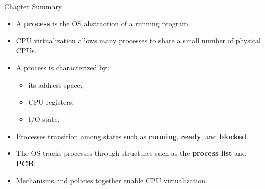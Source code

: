 \begin{frame}{Chapter Summary}

\begin{itemize}
    \item A \textbf{process} is the OS abstraction of a running program.
    \item CPU virtualization allows many processes to share a small
          number of physical CPUs.
    \item A process is characterized by:
    \begin{itemize}
        \item its address space;
        \item CPU registers;
        \item I/O state.
    \end{itemize}
    \item Processes transition among states such as
          \textbf{running}, \textbf{ready}, and \textbf{blocked}.
    \item The OS tracks processes through structures such as the
          \textbf{process list} and \textbf{PCB}.
    \item Mechanisms and policies together enable CPU virtualization.
\end{itemize}

\end{frame}